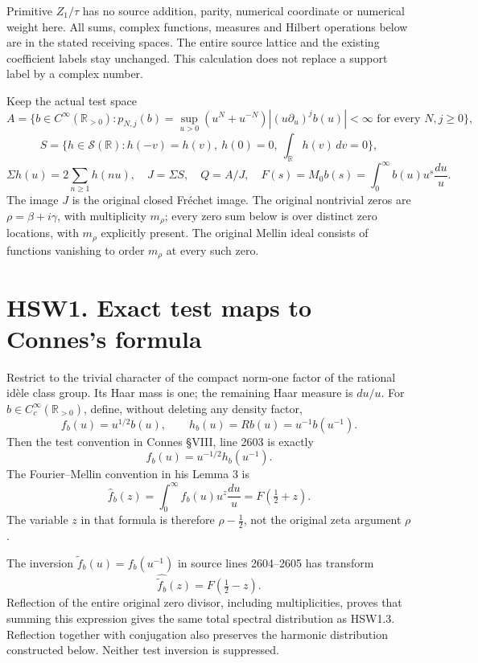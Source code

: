 Primitive \(Z_1/\tau\) has no source addition, parity, numerical
coordinate or numerical weight here. All sums, complex functions,
measures and Hilbert operations below are in the stated receiving
spaces. The entire source lattice and the existing coefficient labels
stay unchanged. This calculation does not replace a support label by a
complex number.

Keep the actual test space \[
A=\{b\in C^\infty(\mathbb R_{>0}):
p_{N,j}(b)=\sup_{u>0}(u^N+u^{-N})|(u\partial_u)^jb(u)|<\infty
\text{ for every }N,j\ge0\},
\] \[
S=\{h\in\mathcal S(\mathbb R):h(-v)=h(v),\ h(0)=0,\ \int_{\mathbb R}h(v)\,dv=0\},
\] \[
\Sigma h(u)=2\sum_{n\ge1}h(nu),\quad J=\Sigma S,\quad Q=A/J,\quad
F(s)=M_0b(s)=\int_0^\infty b(u)u^s\frac{du}{u}.
\tag{HSW0.1}
\] The image \(J\) is the original closed Fréchet image. The original
nontrivial zeros are \(\rho=\beta+i\gamma\), with multiplicity
\(m_\rho\); every zero sum below is over distinct zero locations, with
\(m_\rho\) explicitly present. The original Mellin ideal consists of
functions vanishing to order \(m_\rho\) at every such zero.

\section{HSW1. Exact test maps to Connes's
formula}\label{hsw1.-exact-test-maps-to-conness-formula}

Restrict to the trivial character of the compact norm-one factor of the
rational idèle class group. Its Haar mass is one; the remaining Haar
measure is \(du/u\). For \(b\in C_c^\infty(\mathbb R_{>0})\), define,
without deleting any density factor, \[
f_b(u)=u^{1/2}b(u),\qquad
h_b(u)=Rb(u)=u^{-1}b(u^{-1}).
\tag{HSW1.1}
\] Then the test convention in Connes §VIII, line 2603 is exactly \[
f_b(u)=u^{-1/2}h_b(u^{-1}).
\tag{HSW1.2}
\] The Fourier--Mellin convention in his Lemma 3 is \[
\widehat f_b(z)=\int_0^\infty f_b(u)u^z\frac{du}{u}
=F(\tfrac12+z).
\tag{HSW1.3}
\] The variable \(z\) in that formula is therefore \(\rho-\tfrac12\),
not the original zeta argument \(\rho\).

The inversion \(\widetilde f_b(u)=f_b(u^{-1})\) in source lines
2604--2605 has transform \[
\widehat{\widetilde f_b}(z)=F(\tfrac12-z).
\tag{HSW1.4}
\] Reflection of the entire original zero divisor, including
multiplicities, proves that summing this expression gives the same total
spectral distribution as HSW1.3. Reflection together with conjugation
also preserves the harmonic distribution constructed below. Neither test
inversion is suppressed.

